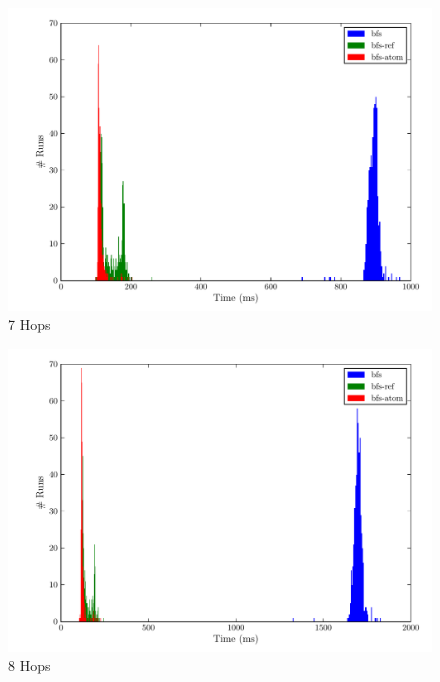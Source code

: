 \documentclass[12pt,letterpaper,oneside]{report}
\theoremstyle{definition}
\begin{document}
		\begin{figure}[!ht]
			\centering
			\includegraphics[scale=0.85]{7_hops}
			\caption{7 Hops}
			\label{fig:perf-7-hops}
		\end{figure}
		
		\begin{figure}[!ht]
			\centering
			\includegraphics[scale=0.85]{8_hops}
			\caption{8 Hops}
			\label{fig:perf-8-hops}
		\end{figure}
		
\end{document}
